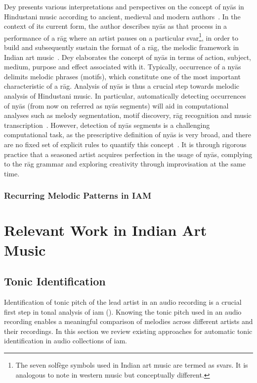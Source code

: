 Dey presents various interpretations and perspectives on the concept of ny\={a}s in Hindustani music according to ancient, medieval and modern authors~\cite{Dey2008}. In the context of its current form, the author describes ny\={a}s as that process in a performance of a r\={a}g where an artist pauses on a particular svar\footnote{The seven solf\`{e}ge symbols used in Indian art music are termed as svars. It is analogous to note in western music but conceptually different.}, in order to build and subsequently sustain the format of a r\={a}g, the melodic framework in Indian art music~\cite[p. 70]{Dey2008}\cite{KKG_SS13}. Dey elaborates the concept of ny\={a}s in terms of action, subject, medium, purpose and effect associated with it. Typically, occurrence of a ny\={a}s delimits melodic phrases (motifs), which constitute one of the most important characteristic of a r\={a}g. Analysis of ny\={a}s is thus a crucial step towards melodic analysis of Hindustani music. In particular, automatically detecting occurrences of ny\={a}s (from now on referred as ny\={a}s segments) will aid in computational analyses such as melody segmentation, motif discovery, r\={a}g recognition and music transcription~\cite{GopalJNMR2012, Rao2014}. However, detection of ny\={a}s segments is a challenging computational task, as the prescriptive definition of ny\={a}s is very broad, and there are no fixed set of explicit rules to quantify this concept~\cite[p. 73]{Dey2008}. It is through rigorous practice that a seasoned artist acquires perfection in the usage of ny\={a}s, complying to the r\={a}g grammar and exploring creativity through improvisation at the same time. 

\subsubsection{Recurring Melodic Patterns in IAM}


\section{Relevant Work in Indian Art Music}
\label{sec:background_relevant_work_iam}


\subsection{Tonic Identification}
\label{sec:background_relevant_work_tonic_identification}

Identification of tonic pitch of the lead artist in an audio recording is a crucial first step in tonal analysis of \gls{iam} (). Knowing the tonic pitch used in an audio recording enables a meaningful comparison of melodies across different artists and their recordings. In this section we review existing approaches for automatic tonic identification in audio collections of \gls{iam}. 

